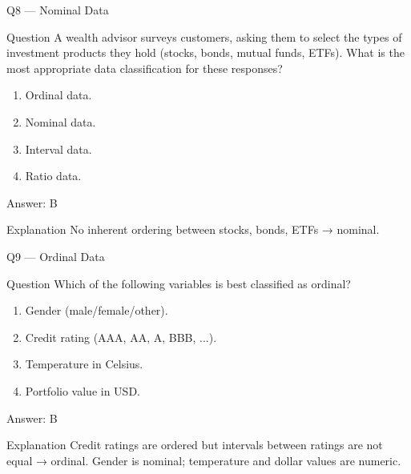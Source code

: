 \documentclass[aspectratio=169,8pt]{beamer}
\begin{document}
	\begin{frame}{Q8 --- Nominal Data}
		\begin{block}{Question}
			A wealth advisor surveys customers, asking them to select the types of investment products they hold (stocks, bonds, mutual funds, ETFs). What is the most appropriate data classification for these responses?
		\end{block}
		\begin{enumerate}
			\item Ordinal data.
			\item Nominal data.
			\item Interval data.
			\item Ratio data.
		\end{enumerate}
		\begin{exampleblock}{Answer: B}\end{exampleblock}
		\begin{block}{Explanation}
			No inherent ordering between stocks, bonds, ETFs → nominal.
		\end{block}
	\end{frame}
	
	\begin{frame}{Q9 --- Ordinal Data}
		\begin{block}{Question}
			Which of the following variables is best classified as ordinal?
		\end{block}
		\begin{enumerate}
			\item Gender (male/female/other).
			\item Credit rating (AAA, AA, A, BBB, ...).
			\item Temperature in Celsius.
			\item Portfolio value in USD.
		\end{enumerate}
		\begin{exampleblock}{Answer: B}\end{exampleblock}
		\begin{block}{Explanation}
			Credit ratings are ordered but intervals between ratings are not equal → ordinal. Gender is nominal; temperature and dollar values are numeric.
		\end{block}
	\end{frame}
	
\end{document}
